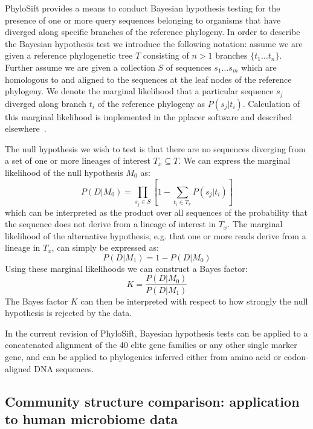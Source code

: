 \documentclass[10pt]{article}
\begin{document}
PhyloSift provides a means to conduct Bayesian hypothesis testing for the presence of one or more query sequences belonging to organisms that have diverged along specific branches of the reference phylogeny.
In order to describe the Bayesian hypothesis test we introduce the following notation: assume we are given a reference phylogenetic tree $T$ consisting of $n > 1$ branches $\{t_1 \dots t_n\}$.
Further assume we are given a collection $S$ of sequences $s_1 \dots s_m$ which are homologous to and aligned to the sequences at the leaf nodes of the reference phylogeny.
We denote the marginal likelihood that a particular sequence $s_j$ diverged along branch $t_i$ of the reference phylogeny as $P(s_j|t_i)$.
Calculation of this marginal likelihood is implemented in the pplacer software and described elsewhere~\cite{Matsen2010}.

The null hypothesis we wish to test is that there are no sequences diverging from a set of one or more lineages of interest $T_x \subseteq T$.
We can express the marginal likelihood of the null hypothesis $M_0$ as:
\begin{equation}\label{eqn:null}
P(D|M_0) = \prod_{s_j \in S} \left[ 1 - \sum_{t_i \in T_x} P(s_j|t_i) \right]
\end{equation}
which can be interpreted as the product over all sequences of the probability that the sequence does not derive from a lineage of interest in $T_x$.
The marginal likelihood of the alternative hypothesis, e.g. that one or more reads derive from a lineage in $T_x$, can simply be expressed as:
\begin{equation}\label{eqn:alt}
P(D|M_1) = 1-P(D|M_0)
\end{equation}
Using these marginal likelihoods we can construct a Bayes factor:
\begin{equation}\label{eqn:bayesfactor}
K=\frac{P(D|M_0)}{P(D|M_1)}
\end{equation}
The Bayes factor $K$ can then be interpreted with respect to how strongly the null hypothesis is rejected by the data.

In the current revision of PhyloSift, Bayesian hypothesis tests can be applied to a concatenated alignment of the 40 elite gene families or any other single marker gene, and can be applied to phylogenies inferred either from amino acid or codon-aligned {DNA} sequences.

\subsection*{Community structure comparison: application to human microbiome data}
\end{document}
